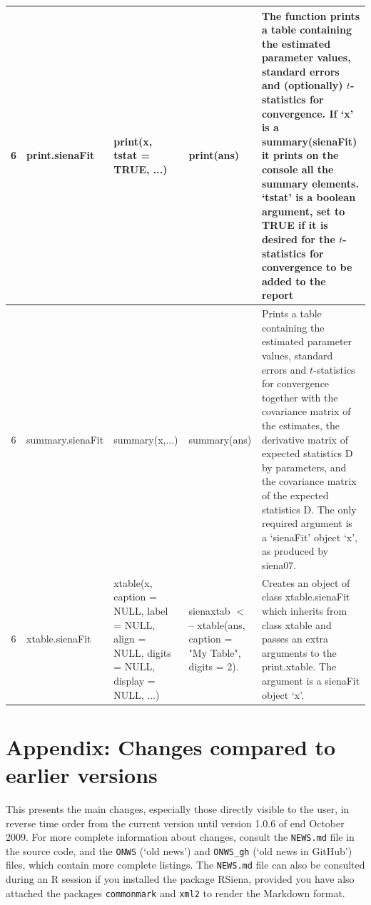 \documentclass[a4paper,fleqn,11pt]{article}
\newcommand{\+}{\, + \,}
\newcommand{\R}{{\sf R }}
\newcommand{\rs}{{\sf RSiena}}
\begin{document}
\begin{landscape}
\begin{small}
\begin{longtable}{c | p{3.8cm} | p{4.5cm} | p{4.0cm} | p{7.4cm} }
6 & print.sienaFit & print(x, tstat = TRUE, ...) & print(ans) & The function
prints a table containing the estimated parameter values, standard errors and
(optionally) $t$-statistics for convergence. If `x' is a summary(sienaFit) it
prints on the console all the summary elements. `tstat' is a boolean
argument, set to TRUE if it is desired for the $t$-statistics for convergence to
be added to the report\\
\hline

6 & summary.sienaFit & summary(x,...) & summary(ans) & Prints a table
containing the estimated parameter values, standard errors and $t$-statistics for
convergence together with the covariance matrix of the estimates, the
derivative matrix of expected statistics D by parameters, and the covariance
matrix of the expected statistics D.  The only required argument is a
`sienaFit' object `x', as produced by \textsf{siena07}.\\
\hline

6 & xtable.sienaFit & xtable(x, caption = NULL, \newline
label = NULL, align = NULL, \newline
digits = NULL,\newline
 display = NULL, ...) & sienaxtab $<$-- \newline
 xtable(ans, \newline
caption = "My Table", \newline
digits = 2).  &Creates an object of class xtable.sienaFit which inherits
from class xtable and passes an extra arguments to the print.xtable.
The argument is a sienaFit object `x'. \\
\hline


\end{longtable}
\end{small}
\end{landscape}


%



\section{Appendix: Changes compared to earlier versions}

This presents the main changes, especially those directly visible to the user,
in reverse time order from the current version until
version 1.0.6 of end October 2009.
For more complete information about changes,
consult the \texttt{NEWS.md} file in the source code,
and the \texttt{ONWS} (`old news') and \texttt{ONWS\_gh} (`old news in GitHub')  files,
which contain more complete listings.
The \texttt{NEWS.md} file can also be consulted during an \R session if you
installed the package \rs, provided you have also attached the
packages \texttt{commonmark} and \texttt{xml2} to render the Markdown format.
\end{document}
